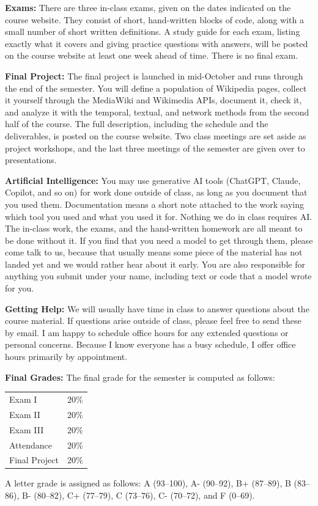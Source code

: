\documentclass[11pt, a4paper]{article}
\begin{document}
\bigskip

\textbf{Exams:}
There are three in-class exams, given on the dates indicated on the course website. They consist of short, hand-written blocks of code, along with a small number of short written definitions. A study guide for each exam, listing exactly what it covers and giving practice questions with answers, will be posted on the course website at least one week ahead of time. There is no final exam.

\bigskip

\textbf{Final Project:}
The final project is launched in mid-October and runs through the end of the semester. You will define a population of Wikipedia pages, collect it yourself through the MediaWiki and Wikimedia APIs, document it, check it, and analyze it with the temporal, textual, and network methods from the second half of the course. The full description, including the schedule and the deliverables, is posted on the course website. Two class meetings are set aside as project workshops, and the last three meetings of the semester are given over to presentations.

\bigskip

\textbf{Artificial Intelligence:}
You may use generative AI tools (ChatGPT, Claude, Copilot, and so on) for work done outside of class, as long as you document that you used them. Documentation means a short note attached to the work saying which tool you used and what you used it for. Nothing we do in class requires AI. The in-class work, the exams, and the hand-written homework are all meant to be done without it. If you find that you need a model to get through them, please come talk to us, because that usually means some piece of the material has not landed yet and we would rather hear about it early. You are also responsible for anything you submit under your name, including text or code that a model wrote for you.


\bigskip

\textbf{Getting Help:}
We will usually have time in class to answer questions about the course
material. If questions arise outside of class, please feel free to send
these by email. I am happy to schedule office hours for any extended questions
or personal concerns. Because I know everyone has a busy schedule, I offer
office hours primarily by appointment.

\bigskip

\textbf{Final Grades:}
The final grade for the semester is computed as follows:

\medskip

\begin{tabular}{ll}
Exam I & 20\% \\
Exam II & 20\% \\
Exam III & 20\% \\
Attendance & 20\% \\
Final Project & 20\% \\
\end{tabular}

\medskip

A letter grade is assigned as follows:
             A (93--100), A- (90--92),
B+ (87--89), B (83--86),  B- (80--82),
C+ (77--79), C (73--76),  C- (70--72), and F (0--69).
\end{document}
